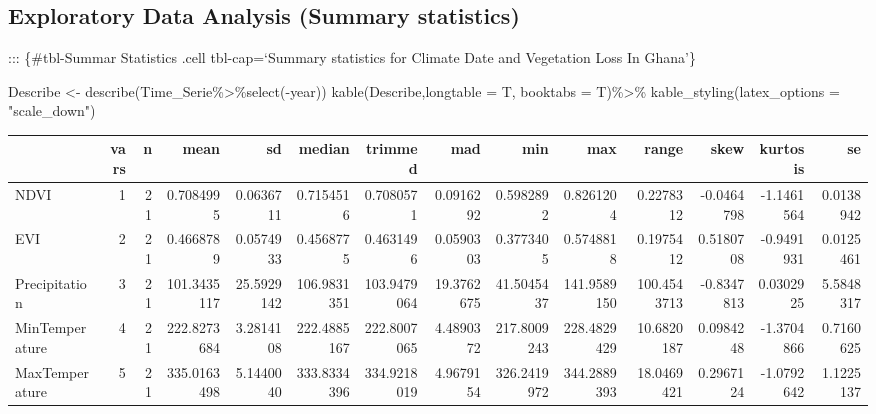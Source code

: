 \documentclass[
  onepage,
  openany]{scrbook}
\newenvironment{Shaded}{}{}
\newcommand{\AttributeTok}[1]{\textcolor[rgb]{0.49,0.56,0.16}{#1}}
\newcommand{\FunctionTok}[1]{\textcolor[rgb]{0.02,0.16,0.49}{#1}}
\newcommand{\NormalTok}[1]{#1}
\newcommand{\OtherTok}[1]{\textcolor[rgb]{0.00,0.44,0.13}{#1}}
\newcommand{\SpecialCharTok}[1]{\textcolor[rgb]{0.25,0.44,0.63}{#1}}
\newcommand{\StringTok}[1]{\textcolor[rgb]{0.25,0.44,0.63}{#1}}
\begin{document}
\hypertarget{exploratory-data-analysis-summary-statistics}{%
\subsection{Exploratory Data Analysis (Summary
statistics)}\label{exploratory-data-analysis-summary-statistics}}

::: \{\#tbl-Summar Statistics .cell tbl-cap=`Summary statistics for
Climate Date and Vegetation Loss In Ghana'\}

\begin{Shaded}
\begin{Highlighting}[]
\NormalTok{Describe }\OtherTok{\textless{}{-}} \FunctionTok{describe}\NormalTok{(Time\_Serie}\SpecialCharTok{\%\textgreater{}\%}\FunctionTok{select}\NormalTok{(}\SpecialCharTok{{-}}\NormalTok{year))}
\FunctionTok{kable}\NormalTok{(Describe,}\AttributeTok{longtable =}\NormalTok{ T, }\AttributeTok{booktabs =}\NormalTok{ T)}\SpecialCharTok{\%\textgreater{}\%}
  \FunctionTok{kable\_styling}\NormalTok{(}\AttributeTok{latex\_options =} \StringTok{"scale\_down"}\NormalTok{)}
\end{Highlighting}
\end{Shaded}

\begin{longtable}{lrrrrrrrrrrrrr}
\toprule
  & vars & n & mean & sd & median & trimmed & mad & min & max & range & skew & kurtosis & se\\
\midrule
NDVI & 1 & 21 & 0.7084995 & 0.0636711 & 0.7154516 & 0.7080571 & 0.0916292 & 0.5982892 & 0.8261204 & 0.2278312 & -0.0464798 & -1.1461564 & 0.0138942\\
EVI & 2 & 21 & 0.4668789 & 0.0574933 & 0.4568775 & 0.4631496 & 0.0590303 & 0.3773405 & 0.5748818 & 0.1975412 & 0.5180708 & -0.9491931 & 0.0125461\\
Precipitation & 3 & 21 & 101.3435117 & 25.5929142 & 106.9831351 & 103.9479064 & 19.3762675 & 41.5045437 & 141.9589150 & 100.4543713 & -0.8347813 & 0.0302925 & 5.5848317\\
MinTemperature & 4 & 21 & 222.8273684 & 3.2814108 & 222.4885167 & 222.8007065 & 4.4890372 & 217.8009243 & 228.4829429 & 10.6820187 & 0.0984248 & -1.3704866 & 0.7160625\\
MaxTemperature & 5 & 21 & 335.0163498 & 5.1440040 & 333.8334396 & 334.9218019 & 4.9679154 & 326.2419972 & 344.2889393 & 18.0469421 & 0.2967124 & -1.0792642 & 1.1225137\\
\bottomrule
\end{longtable}
\end{document}
